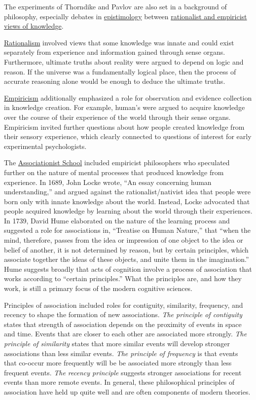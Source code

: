 \documentclass[
  oneside,
  12pt]{crumpbook}
\begin{document}
The experiments of Thorndike and Pavlov are also set in a background of philosophy, especially debates in \href{https://en.wikipedia.org/wiki/Epistemology}{epistimology} between \href{https://plato.stanford.edu/entries/rationalism-empiricism/}{rationalist and empiricist views of knowledge}.

\href{https://en.wikipedia.org/wiki/Rationalism}{Rationalism} involved views that some knowledge was innate and could exist separately from experience and information gained through sense organs. Furthermore, ultimate truths about reality were argued to depend on logic and reason. If the universe was a fundamentally logical place, then the process of accurate reasoning alone would be enough to deduce the ultimate truths.

\href{https://en.wikipedia.org/wiki/Empiricism}{Empiricism} additionally emphasized a role for observation and evidence collection in knowledge creation. For example, human's were argued to acquire knowledge over the course of their experience of the world through their sense organs. Empiricism invited further questions about how people created knowledge from their sensory experience, which clearly connected to questions of interest for early experimental psychologists.

The \href{https://en.wikipedia.org/wiki/Associationism\#Associationist_School}{Associationist School} included empiricist philosophers who speculated further on the nature of mental processes that produced knowledge from experience. In 1689, John Locke wrote, ``An essay concerning human understanding,'' and argued against the rationalist/nativist idea that people were born only with innate knowledge about the world. Instead, Locke advocated that people acquired knowledge by learning about the world through their experiences. In 1739, David Hume elaborated on the nature of the learning process and suggested a role for associations in, ``Treatise on Human Nature,'' that ``when the mind, therefore, passes from the idea or impression of one object to the idea or belief of another, it is not determined by reason, but by certain principles, which associate together the ideas of these objects, and unite them in the imagination.'' Hume suggests broadly that acts of cognition involve a process of association that works according to ``certain principles.'' What the principles are, and how they work, is still a primary focus of the modern cognitive sciences.

Principles of association included roles for contiguity, similarity, frequency, and recency to shape the formation of new associations. \emph{The principle of contiguity} states that strength of association depends on the proximity of events in space and time. Events that are closer to each other are associated more strongly. \emph{The principle of similarity} states that more similar events will develop stronger associations than less similar events. \emph{The principle of frequency} is that events that co-occur more frequently will be be associated more strongly than less frequent events. \emph{The recency principle} suggests stronger associations for recent events than more remote events. In general, these philosophical principles of association have held up quite well and are often components of modern theories.
\end{document}
